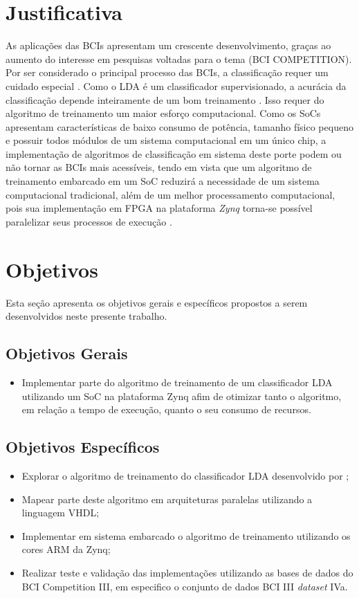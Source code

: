 \section{Justificativa}
As aplicações das BCIs apresentam um crescente desenvolvimento, graças ao aumento do interesse em pesquisas voltadas para o tema (BCI COMPETITION). Por ser considerado o principal processo das BCIs, a classificação requer um cuidado especial \cite{MasonAndBirch}. Como o LDA é um classificador supervisionado, a acurácia da classificação depende inteiramente de um bom treinamento \cite{F.Lotte}. Isso requer do algoritmo de treinamento um maior esforço computacional. Como os SoCs apresentam características de baixo consumo de potência, tamanho físico pequeno e possuir todos módulos de um sistema computacional em um único chip, a implementação de algoritmos de classificação em sistema deste porte podem ou não tornar as BCIs mais acessíveis, tendo em vista que um algoritmo de treinamento embarcado em um SoC reduzirá a necessidade de um sistema computacional tradicional, além de um melhor processamento computacional, pois sua implementação em FPGA na plataforma \textit{Zynq} torna-se possível paralelizar seus processos de execução \cite{zynqBook}.

\section{Objetivos}
Esta seção apresenta os objetivos gerais e específicos propostos a serem desenvolvidos neste
 presente trabalho.
\subsection{Objetivos Gerais}
\begin{itemize}
	\item Implementar parte do algoritmo de treinamento de um classificador LDA utilizando um SoC na plataforma Zynq afim de otimizar tanto o algoritmo, em relação a tempo de execução, quanto o seu consumo de recursos.
\end{itemize} 
\subsection{Objetivos Específicos}

\begin{itemize}
	\item Explorar o algoritmo de treinamento do classificador LDA desenvolvido por \cite{F.Lotte};
	\item Mapear parte deste algoritmo em arquiteturas paralelas utilizando a linguagem VHDL;
	\item Implementar em sistema embarcado o algoritmo de treinamento utilizando os cores ARM da Zynq;
	\item Realizar teste e validação das implementações utilizando as bases de dados do BCI Competition III, em especifico o conjunto de dados BCI III \textit{dataset} IVa.
\end{itemize}
